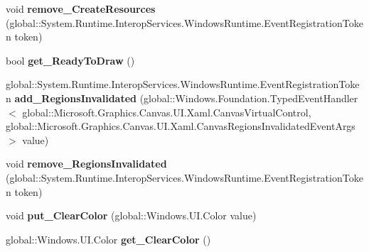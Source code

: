\begin{DoxyCompactItemize}
void {\bfseries remove\+\_\+\+Create\+Resources} (global\+::\+System.\+Runtime.\+Interop\+Services.\+Windows\+Runtime.\+Event\+Registration\+Token token)
\item 
\mbox{\label{class_microsoft_1_1_graphics_1_1_canvas_1_1_u_i_1_1_xaml_1_1_canvas_virtual_control_af6528db89b7f78c8130c559d594d8300}} 
bool {\bfseries get\+\_\+\+Ready\+To\+Draw} ()
\item 
\mbox{\label{class_microsoft_1_1_graphics_1_1_canvas_1_1_u_i_1_1_xaml_1_1_canvas_virtual_control_a4e2d94f4f40419484642f72168ab3bb1}} 
global\+::\+System.\+Runtime.\+Interop\+Services.\+Windows\+Runtime.\+Event\+Registration\+Token {\bfseries add\+\_\+\+Regions\+Invalidated} (global\+::\+Windows.\+Foundation.\+Typed\+Event\+Handler$<$ global\+::\+Microsoft.\+Graphics.\+Canvas.\+U\+I.\+Xaml.\+Canvas\+Virtual\+Control, global\+::\+Microsoft.\+Graphics.\+Canvas.\+U\+I.\+Xaml.\+Canvas\+Regions\+Invalidated\+Event\+Args $>$ value)
\item 
\mbox{\label{class_microsoft_1_1_graphics_1_1_canvas_1_1_u_i_1_1_xaml_1_1_canvas_virtual_control_a6ca7dfb4d3d175d3b2a55029b1f0f300}} 
void {\bfseries remove\+\_\+\+Regions\+Invalidated} (global\+::\+System.\+Runtime.\+Interop\+Services.\+Windows\+Runtime.\+Event\+Registration\+Token token)
\item 
\mbox{\label{class_microsoft_1_1_graphics_1_1_canvas_1_1_u_i_1_1_xaml_1_1_canvas_virtual_control_af130409d50f1c44d00f3db3c4c54e318}} 
void {\bfseries put\+\_\+\+Clear\+Color} (global\+::\+Windows.\+U\+I.\+Color value)
\item 
\mbox{\label{class_microsoft_1_1_graphics_1_1_canvas_1_1_u_i_1_1_xaml_1_1_canvas_virtual_control_ad85b4cdd55249b068fd5faca1d6a7339}} 
global\+::\+Windows.\+U\+I.\+Color {\bfseries get\+\_\+\+Clear\+Color} ()
\item 
\mbox{\label{class_microsoft_1_1_graphics_1_1_canvas_1_1_u_i_1_1_xaml_1_1_canvas_virtual_control_afd788b24472d49a5bfc528818f1b2897}} 

\end{DoxyCompactItemize}
